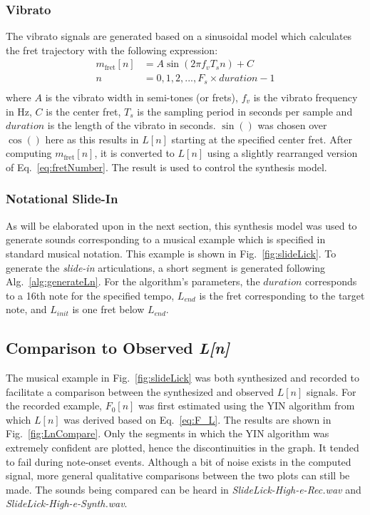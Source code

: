 \documentclass[../main.tex]{subfiles}
\begin{document}
\subsubsection{Vibrato}
The vibrato signals are generated based on a sinusoidal model which calculates the fret trajectory with the following expression:
\begin{align}
\label{eq:vib}
    m_{\text{fret}}[n] &= A\sin(2\pi f_v T_s n) + C\\
    n & = 0, 1, 2, ... , F_s\times  duration - 1\\
\end{align}
where $A$ is the vibrato width in semi-tones (or frets), $f_v$ is the vibrato frequency in Hz, $C$ is the center fret, $T_s$ is the sampling period in seconds per sample and $duration$ is the length of the vibrato in seconds. $\sin()$ was chosen over $\cos()$ here as this results in $L[n]$ starting at the specified center fret. After computing $m_{\text{fret}}[n]$, it is converted to $L[n]$ using a slightly rearranged version of Eq.~\ref{eq:fretNumber}. The result is used to control the synthesis model.

\subsubsection{Notational Slide-In}
As will be elaborated upon in the next section, this synthesis model was used to generate sounds corresponding to a musical example which is specified in standard musical notation. This example is shown in Fig.~\ref{fig:slideLick}. To generate the \emph{slide-in} articulations, a short segment is generated following Alg.~\ref{alg:generateLn}. For the algorithm's parameters, the $duration$ corresponds to a 16th note for the specified tempo, $L_{end}$ is the fret corresponding to the target note, and $L_{init}$ is one fret below $L_{end}$.

\subsection{Comparison to Observed \emph{L[n]}}
\label{subsec:Ch6LnCompare}
The musical example in Fig.~\ref{fig:slideLick} was both synthesized and recorded to facilitate a comparison between the synthesized and observed $L[n]$ signals. For the recorded example, $F_0[n]$ was first estimated using the YIN algorithm  from which $L[n]$ was derived based on Eq.~\ref{eq:F_L}. The results are shown in Fig.~\ref{fig:LnCompare}. Only the segments in which the YIN algorithm was extremely confident are plotted, hence the discontinuities in the graph. It tended to fail during note-onset events. Although a bit of noise exists in the computed signal, more general qualitative comparisons between the two plots can still be made. The sounds being compared can be heard in \emph{SlideLick-High-e-Rec.wav} and \emph{SlideLick-High-e-Synth.wav}.
\end{document}
